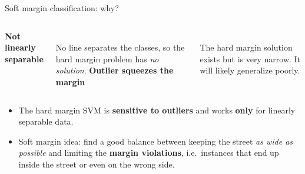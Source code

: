 \documentclass[aspectratio=169,10pt]{beamer}
\newcommand{\axes}{%
  \draw[->,gray] (-0.2,0) -- (6.3,0) node[below] {\scriptsize $x_1$};
  \draw[->,gray] (0,-0.2) -- (0,6.3) node[left] {\scriptsize $x_2$};
}
\newcommand{\posdata}{%
  \foreach \p in {(3,3),(4,2),(5,4),(4.5,3),(3.5,4.5),(5.5,2.2)} \node[ptpos] at \p {};
}
\newcommand{\negdata}{%
  \foreach \p in {(1,1),(0.5,1.5),(0.4,0.6),(1.2,0.3),(0.2,1.2)} \node[ptneg] at \p {};
}
\begin{document}
\begin{frame}{Soft margin classification: why?}
\begin{columns}[T]
\centering
\textbf{Not linearly separable}\\[3pt]
\\
\scriptsize No line separates the classes, so the hard margin problem has \emph{no solution}.
\centering
\textbf{Outlier squeezes the margin}\\[3pt]
\\
\scriptsize The hard margin solution exists but is very narrow. It will likely generalize poorly.
\end{columns}
\vspace{6pt}
\small
\begin{itemize}
  \item The hard margin SVM is \textbf{sensitive to outliers} and works \textbf{only} for linearly separable data.
  \item \alert{Soft margin idea:} find a good balance between keeping the street \emph{as wide as possible} and limiting the \textbf{margin violations}, i.e.\ instances that end up inside the street or even on the wrong side.
\end{itemize}
\end{frame}
\end{document}

